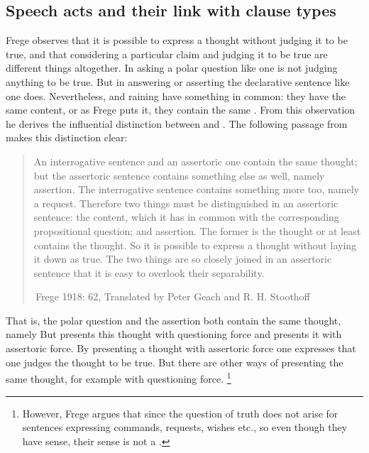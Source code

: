 \subsection{Speech acts and their link with clause types} \label{sec:bg:theory:speech}
Frege observes that it is possible to express a thought without judging it to be true, and that considering a particular claim and judging it to be true are different things altogether. In asking a polar question like one is not judging anything to be true. But in answering or asserting the declarative sentence like  one does. Nevertheless,  and  raining have something in common: they have the same content, or as Frege puts it, they contain the same . From this observation he derives the influential distinction between  and . The following passage from  makes this distinction clear:

\begin{quote}
    

An interrogative sentence and an assertoric one contain the same thought; but the assertoric sentence contains something else as well, namely assertion. The interrogative sentence contains something more too, namely a request. Therefore two things must be distinguished in an assertoric sentence: the content, which it has in common with the corresponding propositional question; and assertion. The former is the thought or at least contains the thought. So it is possible to express a thought without laying it down as true. The two things are so closely joined in an assertoric sentence that it is easy to overlook their separability. 

$\,$\hfill Frege 1918: 62, Translated by Peter Geach and R. H. Stoothoff
\end{quote}

That is, the polar question  and the assertion  both contain the same thought, namely   But  presents this thought with questioning force and  presents it with assertoric force. By presenting a thought with assertoric force one expresses that one judges the thought to be true. But there are other ways of presenting the same thought, for example with questioning force. \footnote{However, Frege argues that since the question of truth does not arise for sentences expressing commands, requests, wishes etc., so even though they have sense, their sense is not a .}

